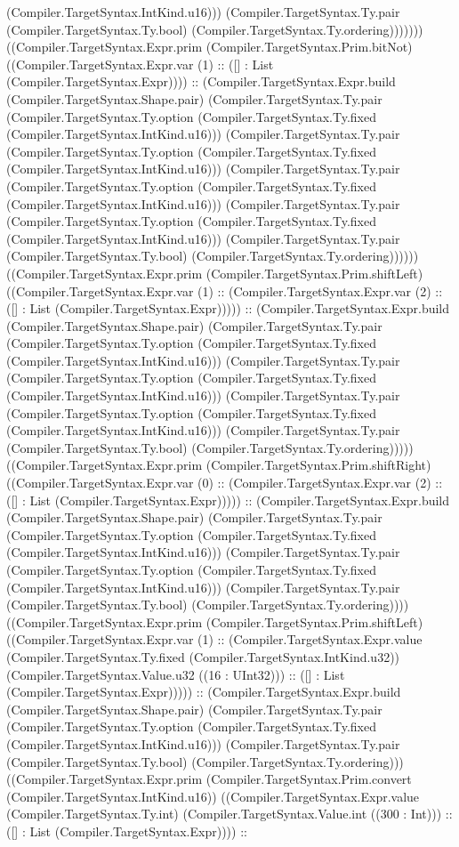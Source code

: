 \documentclass[11pt]{article}
\begin{document}
(Compiler.TargetSyntax.IntKind.u16))) (Compiler.TargetSyntax.Ty.pair (Compiler.TargetSyntax.Ty.bool) (Compiler.TargetSyntax.Ty.ordering))))))) ((Compiler.TargetSyntax.Expr.prim (Compiler.TargetSyntax.Prim.bitNot) ((Compiler.TargetSyntax.Expr.var (1) :: ([] : List (Compiler.TargetSyntax.Expr)))) :: (Compiler.TargetSyntax.Expr.build (Compiler.TargetSyntax.Shape.pair) (Compiler.TargetSyntax.Ty.pair (Compiler.TargetSyntax.Ty.option (Compiler.TargetSyntax.Ty.fixed (Compiler.TargetSyntax.IntKind.u16))) (Compiler.TargetSyntax.Ty.pair (Compiler.TargetSyntax.Ty.option (Compiler.TargetSyntax.Ty.fixed (Compiler.TargetSyntax.IntKind.u16))) (Compiler.TargetSyntax.Ty.pair (Compiler.TargetSyntax.Ty.option (Compiler.TargetSyntax.Ty.fixed (Compiler.TargetSyntax.IntKind.u16))) (Compiler.TargetSyntax.Ty.pair (Compiler.TargetSyntax.Ty.option (Compiler.TargetSyntax.Ty.fixed (Compiler.TargetSyntax.IntKind.u16))) (Compiler.TargetSyntax.Ty.pair (Compiler.TargetSyntax.Ty.bool) (Compiler.TargetSyntax.Ty.ordering)))))) ((Compiler.TargetSyntax.Expr.prim (Compiler.TargetSyntax.Prim.shiftLeft) ((Compiler.TargetSyntax.Expr.var (1) :: (Compiler.TargetSyntax.Expr.var (2) :: ([] : List (Compiler.TargetSyntax.Expr))))) :: (Compiler.TargetSyntax.Expr.build (Compiler.TargetSyntax.Shape.pair) (Compiler.TargetSyntax.Ty.pair (Compiler.TargetSyntax.Ty.option (Compiler.TargetSyntax.Ty.fixed (Compiler.TargetSyntax.IntKind.u16))) (Compiler.TargetSyntax.Ty.pair (Compiler.TargetSyntax.Ty.option (Compiler.TargetSyntax.Ty.fixed (Compiler.TargetSyntax.IntKind.u16))) (Compiler.TargetSyntax.Ty.pair (Compiler.TargetSyntax.Ty.option (Compiler.TargetSyntax.Ty.fixed (Compiler.TargetSyntax.IntKind.u16))) (Compiler.TargetSyntax.Ty.pair (Compiler.TargetSyntax.Ty.bool) (Compiler.TargetSyntax.Ty.ordering))))) ((Compiler.TargetSyntax.Expr.prim (Compiler.TargetSyntax.Prim.shiftRight) ((Compiler.TargetSyntax.Expr.var (0) :: (Compiler.TargetSyntax.Expr.var (2) :: ([] : List (Compiler.TargetSyntax.Expr))))) :: (Compiler.TargetSyntax.Expr.build (Compiler.TargetSyntax.Shape.pair) (Compiler.TargetSyntax.Ty.pair (Compiler.TargetSyntax.Ty.option (Compiler.TargetSyntax.Ty.fixed (Compiler.TargetSyntax.IntKind.u16))) (Compiler.TargetSyntax.Ty.pair (Compiler.TargetSyntax.Ty.option (Compiler.TargetSyntax.Ty.fixed (Compiler.TargetSyntax.IntKind.u16))) (Compiler.TargetSyntax.Ty.pair (Compiler.TargetSyntax.Ty.bool) (Compiler.TargetSyntax.Ty.ordering)))) ((Compiler.TargetSyntax.Expr.prim (Compiler.TargetSyntax.Prim.shiftLeft) ((Compiler.TargetSyntax.Expr.var (1) :: (Compiler.TargetSyntax.Expr.value (Compiler.TargetSyntax.Ty.fixed (Compiler.TargetSyntax.IntKind.u32)) (Compiler.TargetSyntax.Value.u32 ((16 : UInt32))) :: ([] : List (Compiler.TargetSyntax.Expr))))) :: (Compiler.TargetSyntax.Expr.build (Compiler.TargetSyntax.Shape.pair) (Compiler.TargetSyntax.Ty.pair (Compiler.TargetSyntax.Ty.option (Compiler.TargetSyntax.Ty.fixed (Compiler.TargetSyntax.IntKind.u16))) (Compiler.TargetSyntax.Ty.pair (Compiler.TargetSyntax.Ty.bool) (Compiler.TargetSyntax.Ty.ordering))) ((Compiler.TargetSyntax.Expr.prim (Compiler.TargetSyntax.Prim.convert (Compiler.TargetSyntax.IntKind.u16)) ((Compiler.TargetSyntax.Expr.value (Compiler.TargetSyntax.Ty.int) (Compiler.TargetSyntax.Value.int ((300 : Int))) :: ([] : List (Compiler.TargetSyntax.Expr)))) :: 
\end{document}
